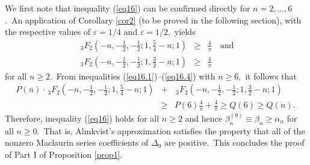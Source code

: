 \documentclass[final,oneeqnum]{siamltex}
\begin{document}
We first note that inequality (\ref{eq16}) can be
confirmed directly for $n=2,\ldots,6$.\  An application of
Corollary \ref{cor2} (to be proved in the following section), with  the respective
values of
$\varepsilon = 1/4$ and $\varepsilon =
1/2,$
 yields
\begin{eqnarray}
\,_{3}F_{2}\left(-n,-\frac{1}{2},-\frac{1}{2};1,\frac{5}{4} -n;1\right)
&\geq& \frac{4}{\pi}
 \quad \mbox{and} \label{eq16.3}\\
\,_{3}F_{2}\left(-n,-\frac{1}{2},-\frac{1}{2};1,\frac{3}{2} -n;1\right)
&\geq& \frac{4}{\pi}
 \label{eq16.4}
\end{eqnarray}
for all $n\geq 2$.\ From inequalities
(\ref{eq16.1})--(\ref{eq16.4}) with
$n\geq 6,$
it follows  that
\begin{eqnarray}
 P(n)\cdot\,_{3}F_{2}\left(-n,-\frac{1}{2},-\frac{1}{2};1,\frac{5}{4}
-n;1\right) &+&
\,_{3}F_{2}\left(-n,-\frac{1}{2},-\frac{1}{2};1,\frac{3}{2} -n;1\right) \nonumber \\
&\geq&  P(6)\frac{4}{\pi}
 + \frac{4}{\pi} \geq Q(6)
\geq Q(n).\  \nonumber
\end{eqnarray} 
Therefore, inequality (\ref{eq16}) holds for all $n\geq 2$
and hence
$\beta^{(9)}_{n}\equiv \beta_{n}\geq
\alpha_{n}$ for all  $n\geq 0$.\ That is, Almkvist's approximation
satisfies the
property that all of the nonzero Maclaurin
series coefficients of
$\Delta_{9}$ are positive.\ This concludes the proof of Part I of
Proposition \ref{prop1}.
\end{document}
